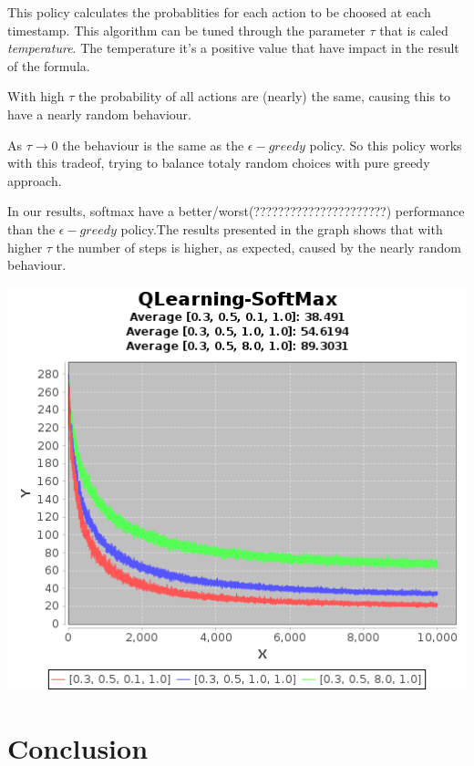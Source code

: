 \documentclass{article}
\begin{document}
This policy calculates the probablities for each action to be choosed at each
timestamp. This algorithm can be tuned through the parameter $\tau$ that is
caled \emph{temperature}.
The temperature it's a positive value that have impact in the result of the
formula.

With high $\tau$ the probability of all actions are (nearly) the same, causing
this to have a nearly random behaviour.

As $\tau \rightarrow 0$ the behaviour is the same as the $\epsilon-greedy$
policy.
So this policy works with this tradeof, trying to balance totaly random choices
with pure greedy approach.

In our results, softmax have a better/worst(??????????????????????) performance
than the $\epsilon-greedy$ policy.The results presented in the graph shows that
with higher $\tau$ the number of steps is higher, as expected, caused by the
nearly random behaviour.

\includegraphics[]{res/alpha_03_gamma_05_temp_01_to_10_IV_1.png}

\section{Conclusion}
\end{document}
